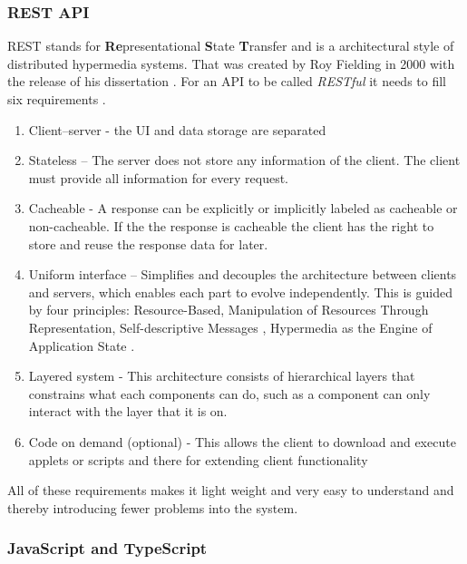 \subsubsection{REST API}%
\label{sub:REST API}
REST stands for \textbf{Re}presentational \textbf{S}tate \textbf{T}ransfer and is a architectural style of distributed hypermedia systems. That was created by Roy Fielding in 2000 with the release of his dissertation \cite{fieldingFieldingDissertationCHAPTER}. For an API to be called \textit{RESTful} it needs to fill six requirements \cite{restfulapi.netWhatREST}.
\begin{enumerate}
  \item Client–server - the UI and data storage are separated
  \item Stateless –  The server does not store any information of the client. The client must provide all information for every request. 
  \item Cacheable - A response can be explicitly or implicitly labeled as cacheable or non-cacheable. If the the response is cacheable the client has the right to store and reuse the response data for later.
  \item Uniform interface – Simplifies and decouples the architecture between clients and servers, which enables each part to evolve independently. This is guided by four principles: Resource-Based, Manipulation of Resources Through Representation, Self-descriptive Messages 
  , Hypermedia as the Engine of Application State \cite{WhatREST} .
  \item Layered system -  This architecture consists of hierarchical layers that constrains what each components can do, such as a component can only interact with the layer that it is on.
  \item  Code on demand (optional) - This allows the client to download and execute applets or scripts and there for extending client functionality
\end{enumerate}


 
All of these requirements makes it light weight and very easy to understand and thereby introducing fewer problems into the system.  



\subsubsection{JavaScript and TypeScript}%
\label{ssub:JavaScript and TypeScript}

